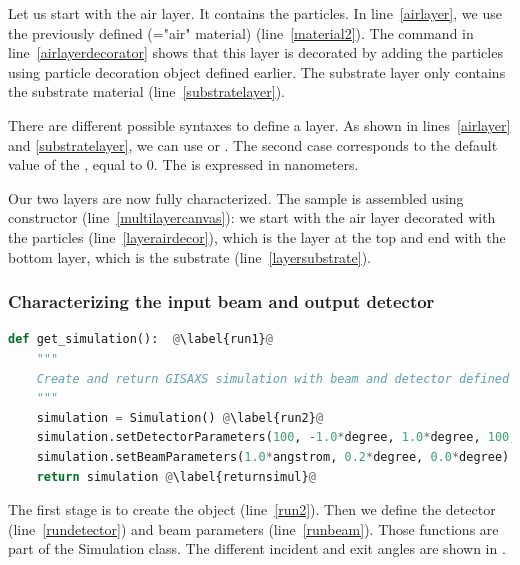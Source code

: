 Let us start with the air layer. It contains the particles. In
line~\ref{airlayer}, we use the previously defined 
(="air" material) (line~\ref{material2}). The command in line~\ref{airlayerdecorator} shows that this layer is decorated by adding the
particles using particle decoration object defined earlier. The substrate layer
only contains the substrate material (line~\ref{substratelayer}).
 
There are different possible syntaxes to define a layer. As shown in
lines~\ref{airlayer} and \ref{substratelayer}, we can use
 or
. The second case corresponds
to the default value of the , equal to 0. The  is
expressed in  nanometers.

Our two layers are now fully characterized. The sample is assembled using
 constructor (line~\ref{multilayercanvas}): we start with the air layer decorated
with the particles (line~\ref{layerairdecor}), which is the layer at
the top and end with the bottom layer, which is the
substrate (line~\ref{layersubstrate}).


%
\subsubsection{Characterizing the input beam and
output detector}

\begin{lstlisting}[language=python, style=eclipseboxed,name=ex1,nolol]
def get_simulation():  @\label{run1}@
    """
    Create and return GISAXS simulation with beam and detector defined
    """
    simulation = Simulation() @\label{run2}@
    simulation.setDetectorParameters(100, -1.0*degree, 1.0*degree, 100, 0.0*degree, 2.0*degree, True) @\label{rundetector}@
    simulation.setBeamParameters(1.0*angstrom, 0.2*degree, 0.0*degree) @\label{runbeam}@
    return simulation @\label{returnsimul}@
\end{lstlisting}
The first stage is to create the  object (line~\ref{run2}). Then we define the detector (line~\ref{rundetector}) and beam
parameters (line~\ref{runbeam}). %
Those functions are part of the Simulation
class.  The different incident and exit angles are
shown in .

